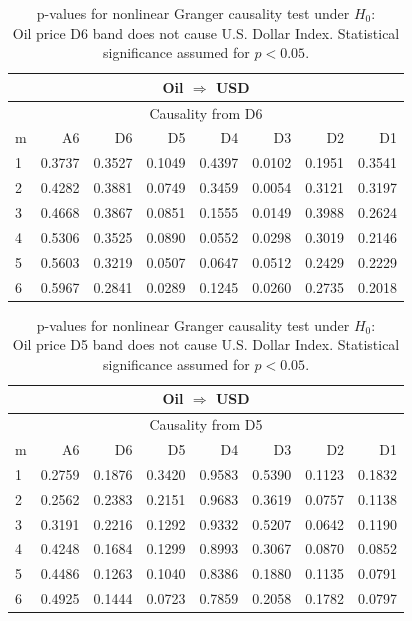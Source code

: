 %
%
\begin{table}[H]
\begin{center}
\begin{tabular}{l|r r r r r r r}
\hline\hline
\multicolumn{8}{c}{Oil $\Rightarrow$ USD}\\
\hline
\multicolumn{8}{c}{Causality from D6}\\
\hline\hline
m & A6 & D6 & D5 & D4 & D3 & D2 & D1 \\
\hline
1 & 0.3737 & 0.3527 & 0.1049 & 0.4397 & \cellcolor{mygrey}0.0102 & 0.1951 & 0.3541 \\
2 & 0.4282 & 0.3881 & 0.0749 & 0.3459 & \cellcolor{mygrey}0.0054 & 0.3121 & 0.3197 \\
3 & 0.4668 & 0.3867 & 0.0851 & 0.1555 & \cellcolor{mygrey}0.0149 & 0.3988 & 0.2624 \\
4 & 0.5306 & 0.3525 & 0.0890 & 0.0552 & \cellcolor{mygrey}0.0298 & 0.3019 & 0.2146 \\
5 & 0.5603 & 0.3219 & 0.0507 & 0.0647 & 0.0512 & 0.2429 & 0.2229 \\
6 & 0.5967 & 0.2841 & \cellcolor{mygrey}0.0289 & 0.1245 & \cellcolor{mygrey}0.0260 & 0.2735 & 0.2018 \\
\hline\hline
\end{tabular}
\caption{p-values for nonlinear Granger causality test under $H_0$:\\
Oil price D6 band does not cause U.S. Dollar Index. Statistical significance assumed for $p<0.05$.}
\end{center}
\end{table}

%
%
\begin{table}[H]
\begin{center}
\begin{tabular}{l|r r r r r r r}
\hline\hline
\multicolumn{8}{c}{Oil $\Rightarrow$ USD}\\
\hline
\multicolumn{8}{c}{Causality from D5}\\
\hline\hline
m & A6 & D6 & D5 & D4 & D3 & D2 & D1 \\
\hline
1 &  0.2759 & 0.1876 & 0.3420 & 0.9583 & 0.5390 & 0.1123 & 0.1832 \\
2 &  0.2562 & 0.2383 & 0.2151 & 0.9683 & 0.3619 & 0.0757 & 0.1138 \\
3 &  0.3191 & 0.2216 & 0.1292 & 0.9332 & 0.5207 & 0.0642 & 0.1190 \\
4 &  0.4248 & 0.1684 & 0.1299 & 0.8993 & 0.3067 & 0.0870 & 0.0852 \\
5 &  0.4486 & 0.1263 & 0.1040 & 0.8386 & 0.1880 & 0.1135 & 0.0791 \\
6 &  0.4925 & 0.1444 & 0.0723 & 0.7859 & 0.2058 & 0.1782 & 0.0797 \\
\hline\hline
\end{tabular}
\caption{p-values for nonlinear Granger causality test under $H_0$:\\
Oil price D5 band does not cause U.S. Dollar Index. Statistical significance assumed for $p<0.05$.}
\end{center}
\end{table}

